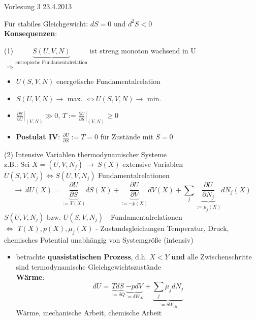 \documentclass[10pt]{scrartcl}
\begin{document}
\begin{flushright}
Vorlesung 3 23.4.2013
\end{flushright}
Für stabiles Gleichgewicht: $dS=0$ und $d^2S<0$\\
\textbf{Konsequenzen}:\\
\begin{fleqn}
(1) $\underbrace{S(U,V,N)}_{\text{entropische Fundamentalrelation}}$ ist streng monoton wachsend in U\\
   $\Rightarrow$
 \begin{itemize}
   \item $U(S,V,N)$ energetische Fundamentalrelation
   \item $S(U,V,N) \rightarrow$ max. $\Leftrightarrow U(S,V,N) \rightarrow$ min. 
   \item $\left.\frac{\partial S}{\partial U}\right|_{(V,N)} \gg 0$, $T:= \left.\frac{\partial U}{\partial S}\right|_{(V,N)} \geq 0$
   \item \textbf{Postulat IV}: $\frac{\partial U}{\partial S} :=T=0$ für Zustände mit $S=0$
 \end{itemize}
 (2) Intensive Variablen thermodynamischer Systeme\\
 z.B.: Sei $X=(U,V,N_j) \ \rightarrow \ S(X)$ extensive Variablen\\
 $U(S,V,N_j) \Leftrightarrow S(U,V,N_j)$ Fundamentalrelationen
 \begin{equation}
   \rightarrow \ dU(X)= \underbrace{\frac{\partial U}{\partial S}}_{:=T(X)} dS(X) + \underbrace{\frac{\partial U}{\partial V}}_{:= -p(X)}dV(X) +\sum_j \underbrace{\frac{\partial U}{\partial N_j}}_{:=\mu_j(X)}dN_j(X)
 \end{equation}
 $S(U,V,N_j)$ bzw. $U(S,V,N_j)$ - Fundamentalrelationen\\
 $\Leftrightarrow$ $T(X),p(X),\mu_j(X)$ - Zustandsgleichungen
 Temperatur, Druck, chemisches Potential unabhängig von Systemgröße (intensiv)
 \begin{itemize}
  \item betrachte \textbf{quasistatischen Prozess}, d.h. $X<Y$ \textbf{und} alle Zwischenschritte sind termodynamische Gleichgewichtszustände\\
   \textbf{Wärme}:
   \begin{equation}
    dU = \underbrace{TdS}_{:=\delta Q} \underbrace{-pdV}_{:=\delta W_M} + \underbrace{\sum_j \mu_j dN_j}_{:=\delta W_{ch}}
   \end{equation}
   Wärme, mechanische Arbeit, chemische Arbeit
 \end{itemize}

\end{fleqn}
\end{document}
